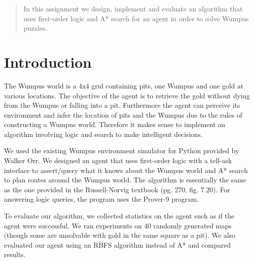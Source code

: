 \documentclass[12pt]{article}
\begin{document}
\maketitle

\begin{abstract}
In this assignment we design, implement and evaluate an algorithm that uses first-order logic and A* search for an agent in order to solve Wumpus puzzles.
\end{abstract}

\section{Introduction}

The Wumpus world is a 4x4 grid containing pits, one Wumpus and one gold at various locations. The objective of the agent is to retrieve the gold without dying from the Wumpus or falling into a pit. Furthermore the agent can perceive its environment and infer the location of pits and the Wumpus due to the rules of constructing a Wumpus world. Therefore it makes sense to implement an algorithm involving logic and search to make intelligent decisions.

We used the existing Wumpus environment simulator for Python provided by Walker Orr. We designed an agent that uses first-order logic with a tell-ask interface to assert/query what it knows about the Wumpus world and A* search to plan routes around the Wumpus world. The algorithm is essentially the same as the one provided in the Russell-Norvig textbook (pg. 270, fig. 7.20). For answering logic queries, the program uses the Prover-9 program.

To evaluate our algorithm, we collected statistics on the agent such as if the agent were successful. We ran experiments on 40 randomly generated maps (though some are unsolvable with gold in the same square as a pit). We also evaluated our agent using an RBFS algorithm instead of A* and compared results.







\end{document}
